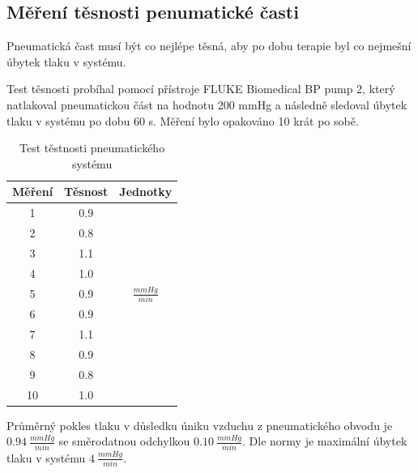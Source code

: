\subsection{Měření těsnosti penumatické časti}
Pneumatická čast musí být co nejlépe těsná, aby po dobu terapie byl co nejmešní úbytek tlaku v systému.
\par
Test těsnosti probíhal pomocí přístroje FLUKE Biomedical BP pump 2, který natlakoval pneumatickou část na hodnotu 200 mmHg a následně sledoval úbytek tlaku v systému po dobu 60 s.
Měření bylo opakováno 10 krát po sobě.

\begin{table}[H]
    \label{tab:pressure_test_pneu}
    \caption{Test těstnosti pneumatického systému}
    \begin{ctucolortab}
        \begin{tabular}{ccc}
            \toprule
            Měření & Těsnost & Jednotky           \\ \midrule
            1      & 0.9     &                    \\
            2      & 0.8     &                    \\
            3      & 1.1     &                    \\
            4      & 1.0     &                    \\
            5      & 0.9     & $\frac{mmHg}{min}$ \\
            6      & 0.9     &                    \\
            7      & 1.1     &                    \\
            8      & 0.9     &                    \\
            9      & 0.8     &                    \\
            10     & 1.0     &                    \\
            \bottomrule
        \end{tabular}
    \end{ctucolortab}
\end{table}
Průměrný pokles tlaku v důsledku úniku vzduchu z pneumatického obvodu je $0.94 \ \frac{mmHg}{min}$ se směrodatnou odchylkou $0.10  \ \frac{mmHg}{min}$. Dle normy je maximální úbytek tlaku v systému $4 \ \frac{mmHg}{min}$.
